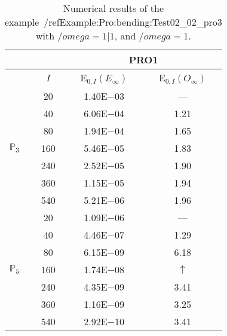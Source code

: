 \begin{table}[H]
\caption{Numerical results of the example~/ref{Example:Pro:bending:Test02_02_pro3} with $/omega=1|1$, and $/omega=1$.}
\setlength{\tabcolsep}{5pt}
\centering
\begin{tabular}{@{}l c c c@{}}
\toprule
 &  & \multicolumn{2}{c}{PRO1}\\
\midrule
 & $I$ & E$_{0,I}(E_{\infty})$ & E$_{0,I}(O_{\infty})$\\
\midrule
\multirow{7}{*}{$\mathbb{P}_{3}$}
 & 20 & 1.40E$-$03 & ---\\
 & 40 & 6.06E$-$04 & 1.21\\
 & 80 & 1.94E$-$04 & 1.65\\
 & 160 & 5.46E$-$05 & 1.83\\
 & 240 & 2.52E$-$05 & 1.90\\
 & 360 & 1.15E$-$05 & 1.94\\
 & 540 & 5.21E$-$06 & 1.96\\
\midrule
\multirow{7}{*}{$\mathbb{P}_{5}$}
 & 20 & 1.09E$-$06 & ---\\
 & 40 & 4.46E$-$07 & 1.29\\
 & 80 & 6.15E$-$09 & 6.18\\
 & 160 & 1.74E$-$08 & $\uparrow$\\
 & 240 & 4.35E$-$09 & 3.41\\
 & 360 & 1.16E$-$09 & 3.25\\
 & 540 & 2.92E$-$10 & 3.41\\
\bottomrule
\end{tabular}
\label{Table:PRO:test_02_02_test5_pro3}
\end{table}

